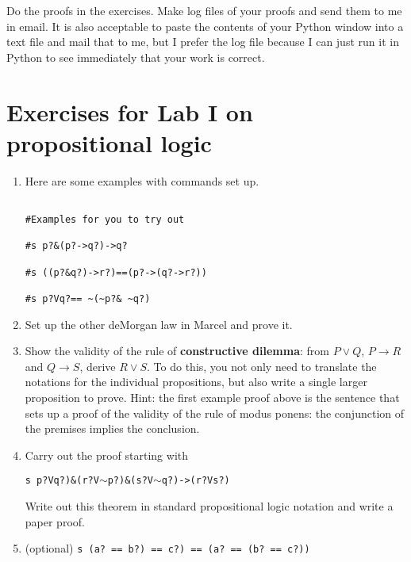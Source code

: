 \documentclass[12pt]{article}
\begin{document}
Do the proofs in the exercises.  Make log files of your proofs and send them to me in email.  It is also acceptable to paste the contents of your Python window into a text file and mail that to me, but I prefer the log file because I can just run it in Python to see immediately that your work is correct.

\section{Exercises for Lab I on propositional logic}

\begin{enumerate}

\item Here are some examples with commands set up.

\begin{verbatim}

#Examples for you to try out

#s p?&(p?->q?)->q?

#s ((p?&q?)->r?)==(p?->(q?->r?))

#s p?Vq?== ~(~p?& ~q?)

\end{verbatim}

\item Set up the other deMorgan law in Marcel and prove it.

\item Show the validity of the rule of {\bf constructive dilemma}:  from $P \vee Q$, $P \rightarrow R$ and $Q \rightarrow S$, derive $R \vee S$.  To do this, you not only need to translate the 
notations for the individual propositions, but also write a single larger proposition to prove.  Hint:  the first example proof above is the sentence
that sets up a proof of the validity of the rule of modus ponens:  the conjunction of the premises implies the conclusion.

\item Carry out the proof starting with 

{\tt s p?Vq?)\&(r?V$\sim$p?)\&(s?V$\sim$q?)->(r?Vs?)}

Write out this theorem in standard propositional logic notation and write a paper proof.

\item (optional) {\tt s (a? == b?) == c?) == (a? == (b? == c?))}

\end{enumerate}
\end{document}
